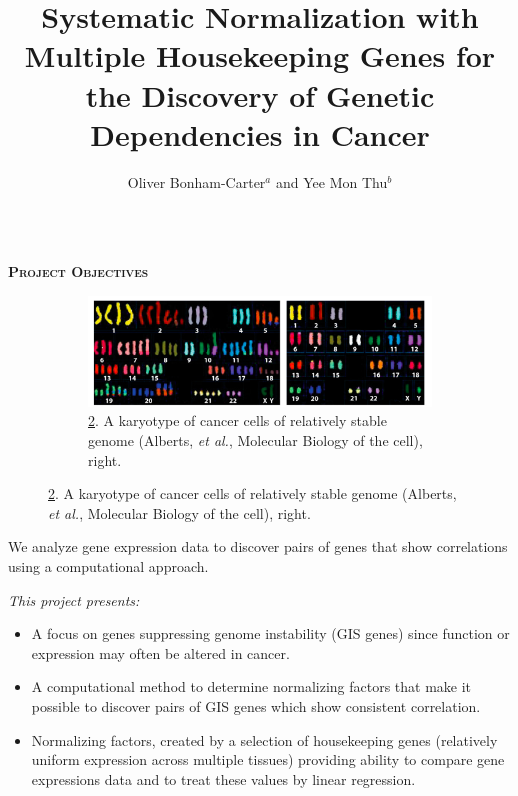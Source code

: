 \documentclass[final,t]{beamer}
\title[]{Systematic Normalization with Multiple Housekeeping Genes
for the Discovery of Genetic Dependencies in Cancer}
\author[Bonham-Carter]{Oliver Bonham-Carter$^{a}$ and Yee Mon Thu$^{b}$}
\institute{Depts of Computer Science$^{a}$ and Biology$^{b}$, Allegheny College \\ Meadville, PA}
\begin{document}
    \begin{frame}{}
        \vspace*{-6mm}
        \begin{columns}[t]
        	\begin{column}{1\linewidth}
%
%

%
%
                \begin{block}{\textsc{\textbf{Project Objectives}}}
				\vspace*{3mm}

				\begin{figure}
					\begin{figure}
						\centering
						\includegraphics[scale = 1.4]{graphics/chromosomes.png}
                        \caption{\ref{fig:chromosomes}. \small A karyotype of cancer cells of relatively stable genome (Alberts, \emph{et al.}, Molecular Biology of the cell), right.}
                        \label{fig:chromosomes}
					\end{figure}
                        \end{figure} 
                        We analyze gene expression data to discover pairs of genes that show correlations using a computational approach. 

                    \emph{This project presents:}
				\begin{itemize}
					\item A focus on genes suppressing genome instability (GIS genes) since function or expression may often be altered in cancer.
					\item  A computational method to determine normalizing factors that make it possible to discover pairs of GIS genes which show consistent correlation.
					\item Normalizing factors, created by a selection of housekeeping genes (relatively uniform expression across multiple tissues) providing ability to compare gene expressions data and to treat these values by linear regression.
				\end{itemize}


\end{block}
\end{column}
\end{columns}
\end{frame}
\end{document}
